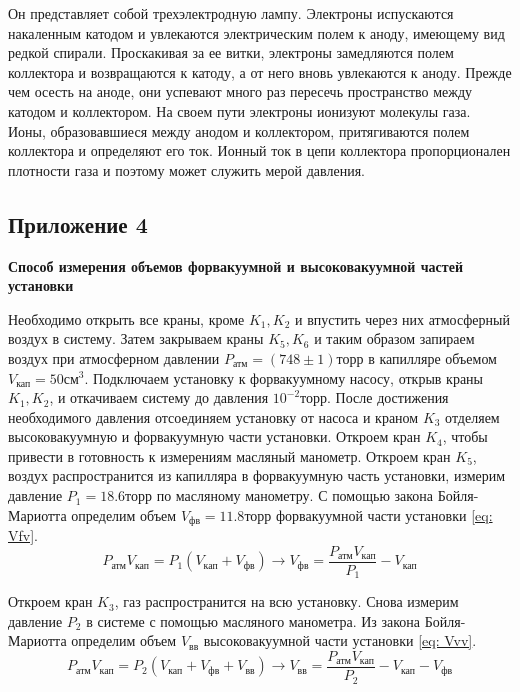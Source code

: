 Он представляет собой трехэлектродную лампу. Электроны испускаются накаленным катодом и увлекаются электрическим полем к аноду, имеющему вид редкой спирали. Проскакивая за ее витки, электроны замедляются полем коллектора и возвращаются к катоду, а от него вновь увлекаются к аноду. Прежде чем осесть на аноде, они успевают много раз пересечь пространство между катодом и коллектором. На своем пути электроны ионизуют молекулы газа. Ионы, образовавшиеся между анодом и коллектором, притягиваются полем коллектора и определяют его
ток. Ионный ток в цепи коллектора пропорционален плотности газа и поэтому может служить мерой давления.
\newpage
\subsection{Приложение 4} \label{Приложение 4}
\textbf{Способ измерения объемов форвакуумной и высоковакуумной частей установки}

Необходимо открыть все краны, кроме $K_1, K_2$ и впустить через них атмосферный воздух в систему. Затем закрываем краны $K_5, K_6$ и таким образом запираем воздух при атмосферном давлении $P_\text{атм} = (748 \pm 1)\text{торр}$ в капилляре объемом $V_\text{кап}= 50\text{см}^3$. Подключаем установку к форвакуумному насосу, открыв краны $K_1, K_2$, и откачиваем систему до давления $10^{-2} \text{торр}$. После достижения необходимого давления отсоединяем установку от насоса и краном $K_3$ отделяем высоковакуумную и форвакуумную части установки. Откроем кран $K_4$, чтобы привести в готовность к измерениям масляный манометр. Откроем кран $K_5$, воздух распространится из капилляра в форвакуумную часть установки, измерим давление $P_1 = 18.6\text{торр}$ по масляному манометру. С помощью закона Бойля-Мариотта определим объем $V_\text{фв} = 11.8\text{торр}$ форвакуумной части установки \eqref{eq: Vfv}.
\begin{equation}
    P_{\text{атм}}V_\text{кап} = P_1 (V_\text{кап}+V_\text{фв}) \rightarrow V_\text{фв} = \frac{P_{\text{атм}}V_\text{кап}}{P_1} - V_\text{кап} \label{eq: Vfv}
\end{equation}

Откроем кран $K_3$, газ распространится на всю установку. Снова измерим давление $P_2$ в системе с помощью масляного манометра. Из закона Бойля-Мариотта определим объем $V_\text{вв}$ высоковакуумной части установки \eqref{eq: Vvv}.
\begin{equation}
    P_{\text{атм}}V_\text{кап} = P_2 (V_\text{кап}+V_\text{фв}+V_\text{вв}) \rightarrow V_\text{вв} = \frac{P_{\text{атм}}V_\text{кап}}{P_2} - V_\text{кап} - V_\text{фв} \label{eq: Vvv}
\end{equation}
\newpage
